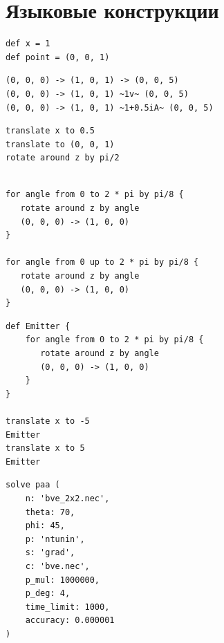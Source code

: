 \documentclass{article}
\begin{document}
\section{Языковые конструкции}

\begin{lstlisting}[caption={Переменные}, label={experiment}]
def x = 1
def point = (0, 0, 1)
\end{lstlisting}

\begin{lstlisting}[caption={Сегментированный провод}, label={experiment}]
(0, 0, 0) -> (1, 0, 1) -> (0, 0, 5)
(0, 0, 0) -> (1, 0, 1) ~1v~ (0, 0, 5)
(0, 0, 0) -> (1, 0, 1) ~1+0.5iA~ (0, 0, 5)
\end{lstlisting}

\begin{lstlisting}[caption={Линейные преобразования}, label={experiment}]
translate x to 0.5
translate to (0, 0, 1)
rotate around z by pi/2
\end{lstlisting}

\begin{lstlisting}[caption={Циклы}, label={experiment}]

for angle from 0 to 2 * pi by pi/8 {
   rotate around z by angle
   (0, 0, 0) -> (1, 0, 0)
}

for angle from 0 up to 2 * pi by pi/8 {
   rotate around z by angle
   (0, 0, 0) -> (1, 0, 0)
}

\end{lstlisting}


\begin{lstlisting}[caption={Группы команд}, label={experiment}]
def Emitter {
    for angle from 0 to 2 * pi by pi/8 {
       rotate around z by angle
       (0, 0, 0) -> (1, 0, 0)
    }
}

translate x to -5
Emitter
translate x to 5
Emitter
\end{lstlisting}

\begin{lstlisting}[caption={Оптимизация направленности ФАР}, label={experiment}]
solve paa (
    n: 'bve_2x2.nec',
    theta: 70,
    phi: 45,
    p: 'ntunin',
    s: 'grad',
    c: 'bve.nec',
    p_mul: 1000000,
    p_deg: 4,
    time_limit: 1000,
    accuracy: 0.000001
)
\end{lstlisting}
\end{document}

